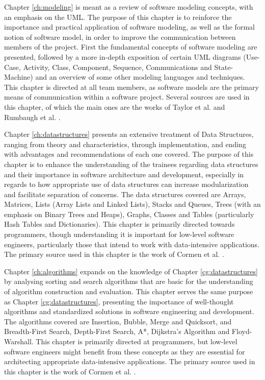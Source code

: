 Chapter \ref{ch:modeling} is meant as a review of software modeling concepts, with an emphasis on the UML. The purpose of this chapter is to reinforce the importance and practical application of software modeling, as well as the formal notion of software model, in order to improve the communication between members of the project. First the fundamental concepts of software modeling are presented, followed by a more in-depth exposition of certain UML diagrams (Use-Case, Activity, Class, Component, Sequence, Communications and State-Machine) and an overview of some other modeling languages and techniques. This chapter is directed at all team members, as software models are the primary means of communication within a software project. Several sources are used in this chapter, of which the main ones are the works of Taylor et al. \cite{TAYLOR:2009} and Rumbaugh et al. \cite{RUMBAUGH:2004} \cite{BOOCH:2005}.

Chapter \ref{ch:datastructures} presents an extensive treatment of Data Structures, ranging from theory and characteristics, through implementation, and ending with advantages and recommendations of each one covered. The purpose of this chapter is to enhance the understanding of the trainees regarding data structures and their importance in software architecture and development, especially in regards to how appropriate use of data structures can increase modularization and facilitate separation of concerns. The data structures covered are Arrays, Matrices, Lists (Array Lists and Linked Lists), Stacks and Queues, Trees (with an emphasis on Binary Trees and Heaps), Graphs, Classes and Tables (particularly Hash Tables and Dictionaries). This chapter is primarily directed towards programmers, though understanding it is important for low-level software engineers, particularly those that intend to work with data-intensive applications. The primary source used in this chapter is the work of Cormen et al. \cite{CORMEN:2001}.

Chapter \ref{ch:algorithms} expands on the knowledge of Chapter \ref{cg:datastructures} by analysing sorting and search algorithms that are basic for the understanding of algorithm construction and evaluation. This chapter serves the same purpose as Chapter \ref{cg:datastructures}, presenting the importance of well-thought algorithms and standardized solutions in software engineering and development. The algorithms covered are Insertion, Bubble, Merge and Quicksort, and Breadth-First Search, Depth-First Search, A*, Dijkstra's Algorithm and Floyd-Warshall. This chapter is primarily directed at programmers, but low-level software engineers might benefit from these concepts as they are essential for architecting appropriate data-intensive applications. The primary source used in this chapter is the work of Cormen et al. \cite{CORMEN:2001}.

